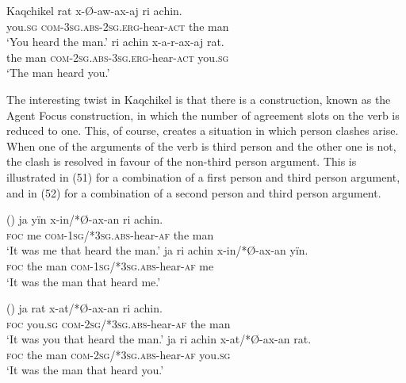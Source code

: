 \documentclass[output=paper]{langsci/langscibook}
\begin{document}
\ea Kaqchikel
\ea 
 \gll rat  x-Ø-aw-ax-aj             ri   achin.    \\
      you.\textsc{sg} \textsc{com}{}-\textsc{3sg.abs-2sg.erg}{}-hear-\textsc{act} the man\\
 \glt ‘You heard the man.’
  \gll       ri achin  x-a-r-ax-aj              rat.\\
         the man \textsc{com-2sg.abs-3sg.erg}{}-hear-\textsc{act} you.\textsc{sg}\\
\glt ‘The man heard you.’
\z
\z

The interesting twist in Kaqchikel is that there is a construction, known as the Agent Focus construction, in which the number of agreement slots on the verb is reduced to one. This, of course, creates a situation in which person clashes arise. When one of the arguments of the verb is third person and the other one is not, the clash is resolved in favour of the non-third person argument. This is illustrated in (51) for a combination of a first person and third person argument, and in (52) for a combination of a second person and third person argument.

\ea (\label{bkm:Ref454183795})  
\ea \gll   ja    yïn x-in/*Ø-ax-an              ri   achin.\\
    \textsc{foc} me \textsc{com-1sg/*3sg.abs}{}-hear-\textsc{af} the man\\
\glt    ‘It was me that heard the man.’
\ex
\gll  ja    ri    achin x-in/*Ø-ax-an                      yïn.\\
    \textsc{foc} the man  \textsc{com-1sg/*3sg.abs}{}-hear-\textsc{af} me\\
\glt    ‘It was the man that heard me.’
\z
\z

\ea (\label{bkm:Ref454183994}) 
\ea \gll  ja     rat x-at/*Ø-ax-an          ri   achin.\\
    \textsc{foc} you.\textsc{sg} \textsc{com-2sg/*3sg.abs}{}-hear-\textsc{af} the man\\
\glt    ‘It was you that heard the man.’
\ex
\gll ja    ri    achin x-at/*Ø-ax-an                        rat.\\
    \textsc{foc} the man   \textsc{com}{}-\textsc{2sg/*3sg.abs}{}-hear-\textsc{af} you.\textsc{sg}\\
\glt    ‘It was the man that heard you.’
\z
\z
\end{document}
